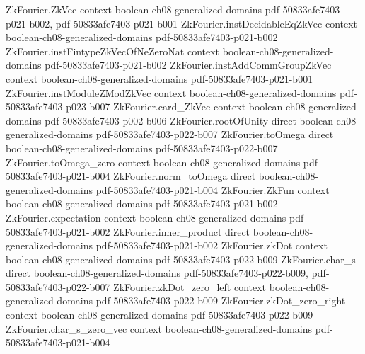 \begin{lemma}
\label{ZkFourier.fourier_coeff_char_self}
\leanok
{}
\proofstep
  {ZkFourier.ZkVec}
  {context}
  {boolean-ch08-generalized-domains}
  {pdf-50833afe7403-p021-b002,
    pdf-50833afe7403-p021-b001}
\proofstep
  {ZkFourier.instDecidableEqZkVec}
  {context}
  {boolean-ch08-generalized-domains}
  {pdf-50833afe7403-p021-b002}
\proofstep
  {ZkFourier.instFintypeZkVecOfNeZeroNat}
  {context}
  {boolean-ch08-generalized-domains}
  {pdf-50833afe7403-p021-b002}
\proofstep
  {ZkFourier.instAddCommGroupZkVec}
  {context}
  {boolean-ch08-generalized-domains}
  {pdf-50833afe7403-p021-b001}
\proofstep
  {ZkFourier.instModuleZModZkVec}
  {context}
  {boolean-ch08-generalized-domains}
  {pdf-50833afe7403-p023-b007}
\proofstep
  {ZkFourier.card_ZkVec}
  {context}
  {boolean-ch08-generalized-domains}
  {pdf-50833afe7403-p002-b006}
\proofstep
  {ZkFourier.rootOfUnity}
  {direct}
  {boolean-ch08-generalized-domains}
  {pdf-50833afe7403-p022-b007}
\proofstep
  {ZkFourier.toOmega}
  {direct}
  {boolean-ch08-generalized-domains}
  {pdf-50833afe7403-p022-b007}
\proofstep
  {ZkFourier.toOmega_zero}
  {context}
  {boolean-ch08-generalized-domains}
  {pdf-50833afe7403-p021-b004}
\proofstep
  {ZkFourier.norm_toOmega}
  {direct}
  {boolean-ch08-generalized-domains}
  {pdf-50833afe7403-p021-b004}
\proofstep
  {ZkFourier.ZkFun}
  {context}
  {boolean-ch08-generalized-domains}
  {pdf-50833afe7403-p021-b002}
\proofstep
  {ZkFourier.expectation}
  {context}
  {boolean-ch08-generalized-domains}
  {pdf-50833afe7403-p021-b002}
\proofstep
  {ZkFourier.inner_product}
  {direct}
  {boolean-ch08-generalized-domains}
  {pdf-50833afe7403-p021-b002}
\proofstep
  {ZkFourier.zkDot}
  {context}
  {boolean-ch08-generalized-domains}
  {pdf-50833afe7403-p022-b009}
\proofstep
  {ZkFourier.char_s}
  {direct}
  {boolean-ch08-generalized-domains}
  {pdf-50833afe7403-p022-b009,
    pdf-50833afe7403-p022-b007}
\proofstep
  {ZkFourier.zkDot_zero_left}
  {context}
  {boolean-ch08-generalized-domains}
  {pdf-50833afe7403-p022-b009}
\proofstep
  {ZkFourier.zkDot_zero_right}
  {context}
  {boolean-ch08-generalized-domains}
  {pdf-50833afe7403-p022-b009}
\proofstep
  {ZkFourier.char_s_zero_vec}
  {context}
  {boolean-ch08-generalized-domains}
  {pdf-50833afe7403-p021-b004}

\end{lemma}
